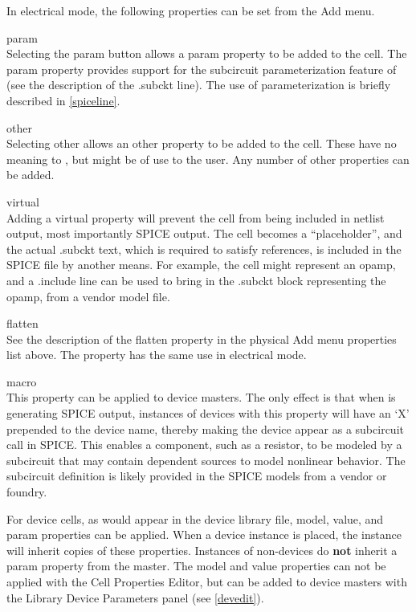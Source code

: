 In electrical mode, the following properties can be set from the
{\cb Add} menu.

\begin{description}
\item{\et param}\\
Selecting the {\cb param} button allows a {\et param} property to be
added to the cell.  The {\et param} property provides support for the
subcircuit parameterization feature of {\WRspice} (see the description
of the {\vt .subckt} line).  The use of parameterization is briefly
described in \ref{spiceline}.

\item{\et other}\\
Selecting {\cb other} allows an {\et other} property to be added to
the cell.  These have no meaning to {\Xic}, but might be of use to the
user.  Any number of {\et other} properties can be added.

\item{\et virtual}\\
Adding a {\et virtual} property will prevent the cell from being
included in netlist output, most importantly SPICE output.  The cell
becomes a ``placeholder'', and the actual {\vt .subckt} text, which is
required to satisfy references, is included in the SPICE file by
another means.  For example, the cell might represent an opamp, and a
{\vt .include} line can be used to bring in the {\vt .subckt} block
representing the opamp, from a vendor model file.

\item{\et flatten}\\
See the description of the {\et flatten} property in the physical {\cb
Add} menu properties list above.  The property has the same use in
electrical mode.

\item{\et macro}\\
This property can be applied to device masters.  The only effect is
that when {\Xic} is generating SPICE output, instances of devices with
this property will have an `{\vt X}' prepended to the device name,
thereby making the device appear as a subcircuit call in SPICE.  This
enables a component, such as a resistor, to be modeled by a subcircuit
that may contain dependent sources to model nonlinear behavior.  The
subcircuit definition is likely provided in the SPICE models from a
vendor or foundry.
\end{description}

For device cells, as would appear in the device library file, {\et
model}, {\et value}, and {\et param} properties can be applied.  When
a device instance is placed, the instance will inherit copies of these
properties.  Instances of non-devices do {\bf not} inherit a {\et
param} property from the master.  The {\et model} and {\et value}
properties can not be applied with the {\cb Cell Properties Editor},
but can be added to device masters with the {\cb Library Device
Parameters} panel (see \ref{devedit}).
 
